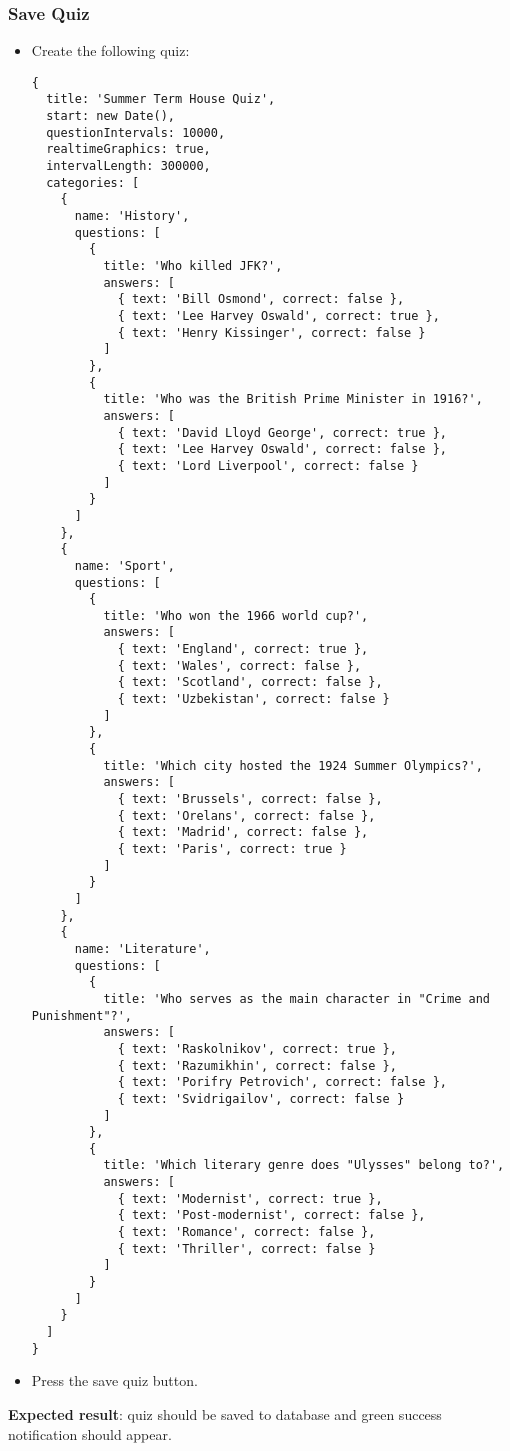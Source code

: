 \subsubsection{Save Quiz}
\begin{itemize}
\item Create the following quiz:
\begin{Verbatim}[fontsize=\small]
{
  title: 'Summer Term House Quiz',
  start: new Date(),
  questionIntervals: 10000,
  realtimeGraphics: true,
  intervalLength: 300000,
  categories: [
    {
      name: 'History',
      questions: [
        {
          title: 'Who killed JFK?',
          answers: [
            { text: 'Bill Osmond', correct: false },
            { text: 'Lee Harvey Oswald', correct: true },
            { text: 'Henry Kissinger', correct: false }
          ]
        },
        {
          title: 'Who was the British Prime Minister in 1916?',
          answers: [
            { text: 'David Lloyd George', correct: true },
            { text: 'Lee Harvey Oswald', correct: false },
            { text: 'Lord Liverpool', correct: false }
          ]
        }
      ]
    },
    {
      name: 'Sport',
      questions: [
        {
          title: 'Who won the 1966 world cup?',
          answers: [
            { text: 'England', correct: true },
            { text: 'Wales', correct: false },
            { text: 'Scotland', correct: false },
            { text: 'Uzbekistan', correct: false }
          ]
        },
        {
          title: 'Which city hosted the 1924 Summer Olympics?',
          answers: [
            { text: 'Brussels', correct: false },
            { text: 'Orelans', correct: false },
            { text: 'Madrid', correct: false },
            { text: 'Paris', correct: true }
          ]
        }
      ]
    },
    {
      name: 'Literature',
      questions: [
        {
          title: 'Who serves as the main character in "Crime and Punishment"?',
          answers: [
            { text: 'Raskolnikov', correct: true },
            { text: 'Razumikhin', correct: false },
            { text: 'Porifry Petrovich', correct: false },
            { text: 'Svidrigailov', correct: false }
          ]
        },
        {
          title: 'Which literary genre does "Ulysses" belong to?',
          answers: [
            { text: 'Modernist', correct: true },
            { text: 'Post-modernist', correct: false },
            { text: 'Romance', correct: false },
            { text: 'Thriller', correct: false }
          ]
        }
      ]
    }
  ]
}
\end{Verbatim}

\item Press the save quiz button.
\end{itemize}
\textbf{Expected result}: quiz should be saved to database and green success notification should appear.
